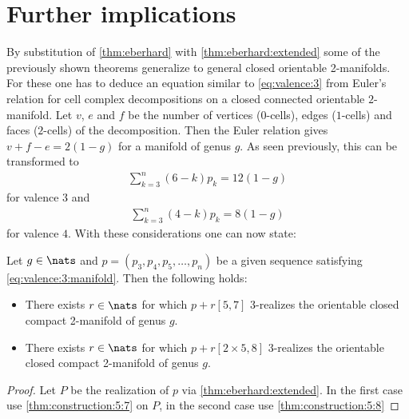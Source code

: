 \section{Further implications}

By substitution of \autoref{thm:eberhard} with \autoref{thm:eberhard:extended} some of the previously shown theorems generalize to general closed orientable 2-manifolds. For these one has to deduce an equation similar to  \autoref{eq:valence:3} from Euler's relation for cell complex decompositions on a closed connected orientable $2$-manifold. Let $v$, $e$ and $f$ be the number of vertices ($0$-cells), edges ($1$-cells) and faces ($2$-cells) of the decomposition. Then the Euler relation gives $v + f - e = 2(1-g)$ for a manifold of genus $g$. As seen previously, this can be transformed to
\begin{align}
  \sum_{k=3}^n \left(6 - k \right) p_k = 12(1-g) \label{eq:valence:3:manifold}
\end{align}
for valence $3$ and
\begin{align}
  \sum_{k=3}^n \left(4 - k \right) p_k = 8(1-g)  \label{eq:valence:4:manifold}
\end{align}
for valence $4$. With these considerations one can now state:
\begin{theorem}
  Let $g \in \nats$ and $p = (p_3, p_4, p_5, \dots, p_n)$ be a given sequence satisfying \autoref{eq:valence:3:manifold}. Then the following holds:
  \begin{itemize}
  \item There exists $r \in \nats$ for which $p + r [5, 7]$ $3$-realizes the orientable closed compact 2-manifold of genus $g$.
  \item There exists $r \in \nats$ for which $p + r [2 \times 5, 8]$ $3$-realizes the orientable closed compact 2-manifold of genus $g$.
  \end{itemize}
  \begin{proof}
    Let $P$ be the realization of $p$ via \autoref{thm:eberhard:extended}. In the first case use \autoref{thm:construction:5:7} on $P$, in the second case use \autoref{thm:construction:5:8}
  \end{proof}
\end{theorem}


